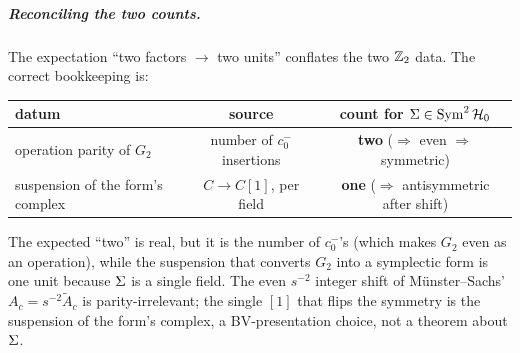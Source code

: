 \subparagraph{Reconciling the two counts.} The expectation \enquote{two factors $\to$ two units} conflates
the two $\mathbb{Z}_2$ data. The correct bookkeeping is:
\begin{center}
	\begin{tabular}{lcc}
		\toprule
		datum & source & count for $\Sigma\in\operatorname{Sym}^2\mathcal{H}_0$ \\
		\midrule
		operation parity of $G_2$ & number of $c_0^-$ insertions & \textbf{two} ($\Rightarrow$ even $\Rightarrow$ symmetric) \\
		suspension of the form's complex & $C\to C[1]$, per field & \textbf{one} ($\Rightarrow$ antisymmetric after shift) \\
		\bottomrule
	\end{tabular}
\end{center}
The expected \enquote{two} is real, but it is the number of $c_0^-$'s (which makes
$G_2$ even as an operation), while the suspension that
converts $G_2$ into a symplectic form is one unit because $\Sigma$ is a single field. The even
$s^{-2}$ integer shift of Münster--Sachs' $A_c=s^{-2}\tilde A_c$ is parity-irrelevant; the
single $[1]$ that flips the symmetry is the suspension of the form's complex, a
BV-presentation choice, not a theorem about $\Sigma$.

